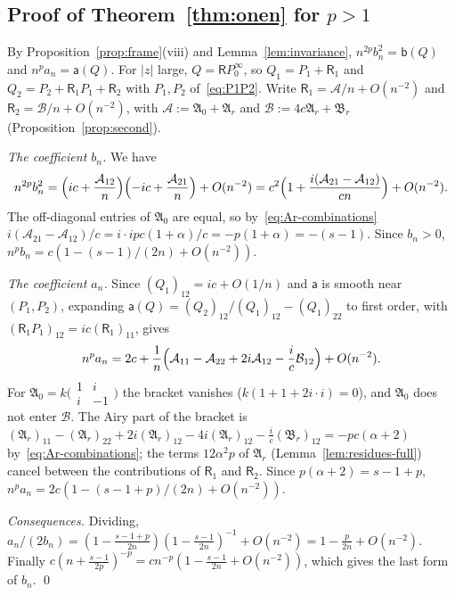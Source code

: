 \subsection{\texorpdfstring{Proof of Theorem~\ref{thm:onen} for $p>1$}{Proof of Theorem 1.4 for p>1}}\label{sec:second-proof}

By Proposition~\ref{prop:frame}(viii) and Lemma~\ref{lem:invariance}, $n^{2p}b_n^2=\mathsf b(Q)$ and $n^pa_n=\mathsf a(Q)$. For $|z|$
large, $Q=\mathsf RP^\infty_0$, so $Q_1=P_1+\mathsf R_1$ and $Q_2=P_2+\mathsf R_1P_1+\mathsf R_2$ with $P_1,P_2$ of~\eqref{eq:P1P2}. Write
$\mathsf R_1=\mathcal A/n+O(n^{-2})$ and $\mathsf R_2=\mathcal B/n+O(n^{-2})$, with $\mathcal A:=\mathfrak A_0+\mathfrak A_r$ and
$\mathcal B:=4c\mathfrak A_r+\mathfrak B_r$ (Proposition~\ref{prop:second}).

\emph{The coefficient $b_n$.} We have
\[
  n^{2p}b_n^2=\Bigl(ic+\frac{\mathcal A_{12}}n\Bigr)\Bigl(-ic+\frac{\mathcal A_{21}}n\Bigr)+O(n^{-2})
  =c^2\Bigl(1+\frac{i(\mathcal A_{21}-\mathcal A_{12})}{cn}\Bigr)+O(n^{-2}).
\]
The off-diagonal entries of $\mathfrak A_0$ are equal, so by~\eqref{eq:Ar-combinations}
$i(\mathcal A_{21}-\mathcal A_{12})/c=i\cdot ipc(1+\alpha)/c=-p(1+\alpha)=-(s-1)$. Since $b_n>0$,
$n^pb_n=c(1-(s-1)/(2n)+O(n^{-2}))$.

\emph{The coefficient $a_n$.} Since $(Q_1)_{12}=ic+O(1/n)$ and $\mathsf a$ is smooth near $(P_1,P_2)$, expanding
$\mathsf a(Q)=(Q_2)_{12}/(Q_1)_{12}-(Q_1)_{22}$ to first order, with $(\mathsf R_1P_1)_{12}=ic(\mathsf R_1)_{11}$, gives
\[
  n^pa_n=2c+\frac1n\Bigl(\mathcal A_{11}-\mathcal A_{22}+2i\mathcal A_{12}-\frac ic\mathcal B_{12}\Bigr)+O(n^{-2}).
\]
For $\mathfrak A_0=k\bigl(\begin{smallmatrix}1&i\\i&-1\end{smallmatrix}\bigr)$ the bracket vanishes ($k(1+1+2i\cdot i)=0$), and
$\mathfrak A_0$ does not enter $\mathcal B$. The Airy part of the bracket is
$(\mathfrak A_r)_{11}-(\mathfrak A_r)_{22}+2i(\mathfrak A_r)_{12}-4i(\mathfrak A_r)_{12}-\frac ic(\mathfrak B_r)_{12}=-pc(\alpha+2)$
by~\eqref{eq:Ar-combinations}; the terms $12\alpha^2p$ of $\mathfrak A_r$ (Lemma~\ref{lem:residues-full}) cancel between the
contributions of $\mathsf R_1$ and $\mathsf R_2$. Since $p(\alpha+2)=s-1+p$, $n^pa_n=2c(1-(s-1+p)/(2n)+O(n^{-2}))$.

\emph{Consequences.} Dividing, $a_n/(2b_n)=(1-\frac{s-1+p}{2n})(1-\frac{s-1}{2n})^{-1}+O(n^{-2})=1-\frac p{2n}+O(n^{-2})$.
Finally $c(n+\frac{s-1}{2p})^{-p}=cn^{-p}(1-\frac{s-1}{2n}+O(n^{-2}))$, which gives the last form of $b_n$.
\qed


